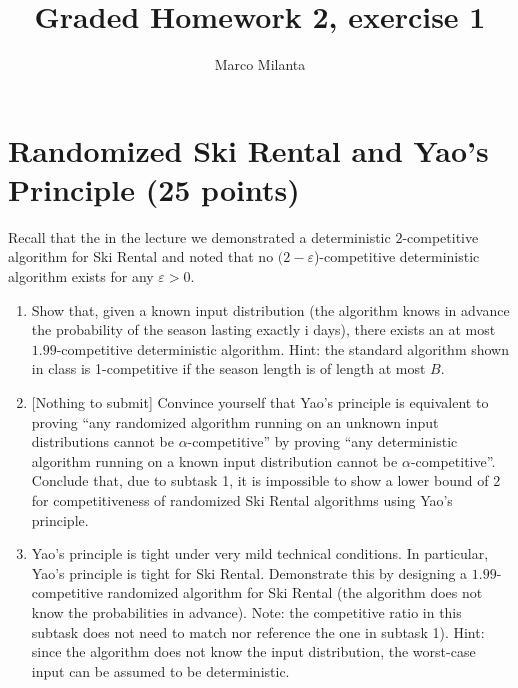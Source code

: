 \documentclass[11pt]{article}
\begin{document}
\author{Marco Milanta}
\title{Graded Homework 2, exercise 1}
\maketitle


\section*{Randomized Ski Rental and Yao's Principle (25 points)}

Recall that the in the lecture we demonstrated a deterministic $2$-competitive algorithm for Ski Rental and noted that no $(2 - \varepsilon$)-competitive deterministic algorithm exists for any $\varepsilon > 0$.
\begin{enumerate}
\item Show that, given a known input distribution (the algorithm knows in advance the probability of the season lasting exactly i days), there exists an at most $1.99$-competitive deterministic algorithm. Hint: the standard algorithm shown in class is 1-competitive if the season length is of length at most $B$.
\item{} [Nothing to submit] Convince yourself that Yao's principle is equivalent to proving ``any randomized algorithm running on an unknown input distributions cannot be $\alpha$-competitive'' by proving ``any deterministic algorithm running on a known input distribution cannot be $\alpha$-competitive''. Conclude that, due to subtask 1, it is impossible to show a lower bound of $2$ for competitiveness of randomized Ski Rental algorithms using Yao's principle. 
\item Yao's principle is tight under very mild technical conditions. In particular, Yao's principle is tight for Ski Rental. Demonstrate this by designing a $1.99$-competitive randomized algorithm for Ski Rental (the algorithm does not know the probabilities in advance). Note: the competitive ratio in this subtask does not need to match nor reference the one in subtask 1). Hint: since the algorithm does not know the input distribution, the worst-case input can be assumed to be deterministic.
\end{enumerate}
\end{document}
